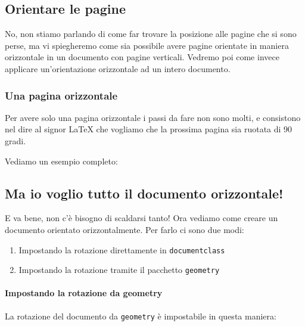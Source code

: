 \newpage
\begin{landscape}

\subsection{Orientare le pagine}

No, non stiamo parlando di come far trovare la posizione alle pagine che si
sono perse, ma vi spiegheremo come sia possibile avere pagine orientate in
maniera orizzontale in un documento con pagine verticali. Vedremo poi come
invece applicare un'orientazione orizzontale ad un intero documento.

\subsubsection{Una pagina orizzontale}

Per avere solo una pagina orizzontale i passi da fare non sono molti, e
consistono nel dire al signor \LaTeX{} che vogliamo che la prossima pagina sia
ruotata di 90 gradi.

\vspace{\abovedisplayskip}
\begin{minipage}{\linewidth}
  \noindent Vediamo un esempio completo:
  
\end{minipage}
\vspace{\belowdisplayskip}

\subsection{Ma io voglio tutto il documento orizzontale!}

E va bene, non c'è bisogno di scaldarsi tanto! Ora vediamo come creare un
documento orientato orizzontalmente. Per farlo ci sono due modi:
\begin{enumerate}
 \item Impostando la rotazione direttamente in \texttt{documentclass}
 \item Impostando la rotazione tramite il pacchetto \texttt{geometry}
\end{enumerate}


\vspace{\abovedisplayskip}
\begin{minipage}{\linewidth}
  \paragraph*{Impostando la rotazione da geometry}

  La rotazione del documento da \texttt{geometry} è impostabile in questa
  maniera:
  


\end{minipage}
\vspace{\belowdisplayskip}

\end{landscape}
\newpage
